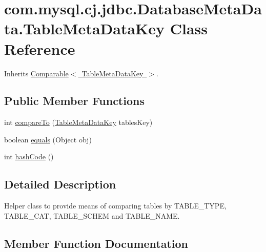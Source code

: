 \hypertarget{classcom_1_1mysql_1_1cj_1_1jdbc_1_1_database_meta_data_1_1_table_meta_data_key}{}\section{com.\+mysql.\+cj.\+jdbc.\+Database\+Meta\+Data.\+Table\+Meta\+Data\+Key Class Reference}
\label{classcom_1_1mysql_1_1cj_1_1jdbc_1_1_database_meta_data_1_1_table_meta_data_key}


Inherits \mbox{\hyperlink{class_comparable}{Comparable$<$ Table\+Meta\+Data\+Key $>$}}.

\subsection*{Public Member Functions}
\begin{DoxyCompactItemize}
\item 
int \mbox{\hyperlink{classcom_1_1mysql_1_1cj_1_1jdbc_1_1_database_meta_data_1_1_table_meta_data_key_aab0f0a7eea9755850746efb0d1de5cfd}{compare\+To}} (\mbox{\hyperlink{classcom_1_1mysql_1_1cj_1_1jdbc_1_1_database_meta_data_1_1_table_meta_data_key}{Table\+Meta\+Data\+Key}} tables\+Key)
\item 
boolean \mbox{\hyperlink{classcom_1_1mysql_1_1cj_1_1jdbc_1_1_database_meta_data_1_1_table_meta_data_key_a528b5033f91e8c4c16f86af5d217b474}{equals}} (Object obj)
\item 
int \mbox{\hyperlink{classcom_1_1mysql_1_1cj_1_1jdbc_1_1_database_meta_data_1_1_table_meta_data_key_a4191e1d451e0c19fc531c2eb7cf047fb}{hash\+Code}} ()
\end{DoxyCompactItemize}


\subsection{Detailed Description}
Helper class to provide means of comparing tables by T\+A\+B\+L\+E\+\_\+\+T\+Y\+PE, T\+A\+B\+L\+E\+\_\+\+C\+AT, T\+A\+B\+L\+E\+\_\+\+S\+C\+H\+EM and T\+A\+B\+L\+E\+\_\+\+N\+A\+ME. 

\subsection{Member Function Documentation}
\mbox{\label{classcom_1_1mysql_1_1cj_1_1jdbc_1_1_database_meta_data_1_1_table_meta_data_key_aab0f0a7eea9755850746efb0d1de5cfd}} 

